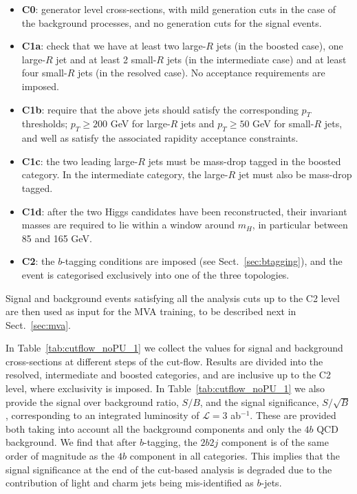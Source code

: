     \begin{itemize}
    \item {\bf C0}:  generator level cross-sections, with
      mild generation cuts in the case of the background processes, and no
      generation cuts
      for the signal events.
    \item {\bf C1a}:  check that we have at least
      two large-$R$ jets (in the boosted case),
      one large-$R$ jet and at least 2 small-$R$ jets (in the intermediate
      case) and at least four small-$R$ jets (in the resolved case).
      No acceptance requirements are imposed.
    \item {\bf C1b}: require that the above jets should
      satisfy the corresponding $p_T$ thresholds;
      $p_T \ge 200$ GeV for large-$R$ jets and
      $p_T \ge 50$ GeV for small-$R$ jets, and well as
      satisfy the associated
      rapidity acceptance constraints.
    \item {\bf C1c}: the two leading large-$R$ jets must
      be mass-drop tagged in the boosted category.
      In the intermediate category, the large-$R$ jet must also be mass-drop tagged.
    \item {\bf C1d}: after the two Higgs candidates  have been reconstructed,
      their invariant masses are required to lie within a window around $m_H$,
      in particular between 85 and 165 GeV.
          \item {\bf C2}: the
            $b$-tagging conditions are
            imposed (see
            Sect.~\ref{sec:btagging}), and the event is categorised exclusively
            into one of the three topologies.
      \end{itemize}
    Signal and background events satisfying all the analysis cuts up to the
    C2 level
    are then used as input for the MVA training, to be described next
    in Sect.~\ref{sec:mva}.

    
    In Table~\ref{tab:cutflow_noPU_1} we collect
    the values for signal and background cross-sections
    at different steps of the cut-flow.
    Results are divided into the resolved, intermediate and boosted categories,
    and are inclusive up to the C2 level, where exclusivity is imposed.
In Table~\ref{tab:cutflow_noPU_1} we also  provide the signal over
      background ratio, $S/B$, and the signal
      significance, $S/\sqrt{B}$, corresponding to an integrated
      luminosity of $\mathcal{L}=3$ ab$^{-1}$.
      These are provided both taking into account all the background components and only
      the $4b$ QCD background.
      We find that after $b$-tagging, the  $2b2j$ component is
      of the same order of magnitude as the $4b$ component in all categories.
      This implies that the signal significance at the end of the cut-based
      analysis is degraded due to the contribution
      of light and charm jets being mis-identified as $b$-jets.
    

